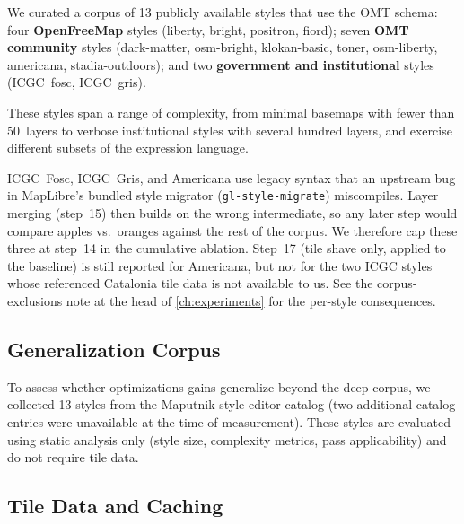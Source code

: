 We curated a corpus of 13 publicly available styles that use the \ac{OMT} schema:
four \textbf{OpenFreeMap} styles (liberty, bright, positron, fiord);
seven \textbf{\ac{OMT} community} styles (dark-matter, osm-bright, klokan-basic, toner, osm-liberty, americana, stadia-outdoors);
and two \textbf{government and institutional} styles (ICGC~fosc, ICGC~gris).

These styles span a range of complexity, from minimal basemaps with fewer than 50~layers to verbose institutional styles with several hundred layers, and exercise different subsets of the expression language.

ICGC~Fosc, ICGC~Gris, and Americana use legacy  syntax that an upstream bug in MapLibre's bundled style migrator (\texttt{gl-style-migrate}) miscompiles.
Layer merging (step~15) then builds on the wrong intermediate, so any later step would compare apples vs.\ oranges against the rest of the corpus.
We therefore cap these three at step~14 in the cumulative ablation.
Step~17 (tile shave only, applied to the baseline) is still reported for Americana, but not for the two ICGC styles whose referenced Catalonia tile data is not available to us.
See the corpus-exclusions note at the head of \cref{ch:experiments} for the per-style consequences.

\subsection{Generalization Corpus}\label{sub:generalization_corpus}

To assess whether optimizations gains generalize beyond the deep corpus, we collected 13 styles from the Maputnik style editor catalog (two additional catalog entries were unavailable at the time of measurement).
These styles are evaluated using static analysis only (style size, complexity metrics, pass applicability) and do not require tile data.

\subsection{Tile Data and Caching}\label{sub:tile_data}

